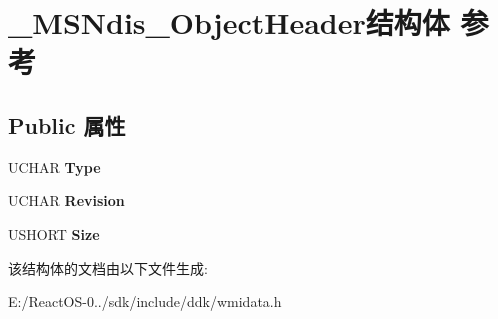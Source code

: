 \hypertarget{struct___m_s_ndis___object_header}{}\section{\+\_\+\+M\+S\+Ndis\+\_\+\+Object\+Header结构体 参考}
\label{struct___m_s_ndis___object_header}
\subsection*{Public 属性}
\begin{DoxyCompactItemize}
\item 
\mbox{\label{struct___m_s_ndis___object_header_ad501b4386cb09a5868e7cc267d920f4c}} 
U\+C\+H\+AR {\bfseries Type}
\item 
\mbox{\label{struct___m_s_ndis___object_header_af38007da5df53bb11bc0f46989ec7b1b}} 
U\+C\+H\+AR {\bfseries Revision}
\item 
\mbox{\label{struct___m_s_ndis___object_header_a5122a6c5aece9bee54830265d459bc53}} 
U\+S\+H\+O\+RT {\bfseries Size}
\end{DoxyCompactItemize}


该结构体的文档由以下文件生成\+:\begin{DoxyCompactItemize}
\item 
E\+:/\+React\+O\+S-\/0../sdk/include/ddk/wmidata.\+h\end{DoxyCompactItemize}
